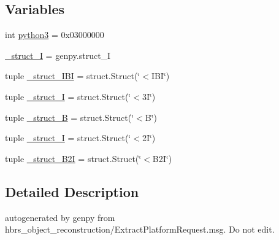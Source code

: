 \subsection*{\-Variables}
\begin{DoxyCompactItemize}
\item 
int \hyperlink{namespacehbrs__object__reconstruction_1_1srv_1_1___extract_platform_aafa500ed1c321b4a5ef9d4ffac4708c9}{python3} = 0x03000000
\item 
\hyperlink{namespacehbrs__object__reconstruction_1_1srv_1_1___extract_platform_abaa32dbafcd48332125e047bae750105}{\-\_\-struct\-\_\-\-I} = genpy.\-struct\-\_\-\-I
\item 
tuple \hyperlink{namespacehbrs__object__reconstruction_1_1srv_1_1___extract_platform_a54f36a69463c7e104c735c3da70d1a83}{\-\_\-struct\-\_\-\-I\-B\-I} = struct.\-Struct(\char`\"{}$<$\-I\-B\-I\char`\"{})
\item 
tuple \hyperlink{namespacehbrs__object__reconstruction_1_1srv_1_1___extract_platform_aa3b747786f9580557fcc9fb258e275b6}{\-\_\-struct\-\_\-I} = struct.\-Struct(\char`\"{}$<$3\-I\char`\"{})
\item 
tuple \hyperlink{namespacehbrs__object__reconstruction_1_1srv_1_1___extract_platform_a1807926cdc8c8ba45de2fac184cac30e}{\-\_\-struct\-\_\-\-B} = struct.\-Struct(\char`\"{}$<$\-B\char`\"{})
\item 
tuple \hyperlink{namespacehbrs__object__reconstruction_1_1srv_1_1___extract_platform_a3fb8827dbb99d3d0c44487fa4448d7fa}{\-\_\-struct\-\_\-I} = struct.\-Struct(\char`\"{}$<$2\-I\char`\"{})
\item 
tuple \hyperlink{namespacehbrs__object__reconstruction_1_1srv_1_1___extract_platform_a7bce26cd8f2e5041c28650b9f4baad54}{\-\_\-struct\-\_\-\-B2\-I} = struct.\-Struct(\char`\"{}$<$\-B2\-I\char`\"{})
\end{DoxyCompactItemize}


\subsection{\-Detailed \-Description}
\begin{DoxyVerb}autogenerated by genpy from hbrs_object_reconstruction/ExtractPlatformRequest.msg. Do not edit.\end{DoxyVerb}
 

